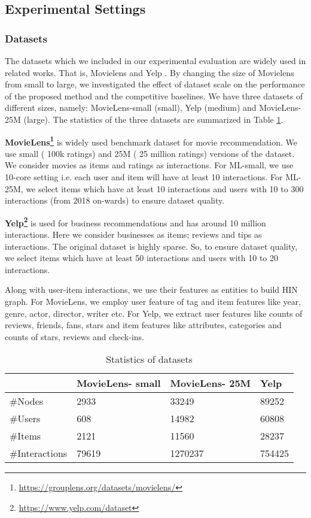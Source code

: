 \documentclass[runningheads, envcountsame, a4paper]{llncs}
\begin{document}
\subsection{Experimental Settings}
\subsubsection{Datasets}
The datasets which we included in our experimental evaluation are widely used in related works. That is, Movielens \cite{berg2017graph,he2015trirank,he2017bneural} and Yelp \cite{wang2019kgat,yu2013recommendation}.
By changing the size of Movielens from small to large, we investigated the effect of dataset scale on the performance of the proposed method and the competitive baselines.
We have three datasets of different sizes, namely: MovieLens-small (small), Yelp (medium) and MovieLens-25M (large). 
The statistics of the three datasets are summarized in Table \ref{tab:datastats}.

\textbf{MovieLens\footnote[1]{\url{https://grouplens.org/datasets/movielens/}}} is widely used benchmark dataset for movie recommendation. We use small ( 100k ratings) and 25M ( 25 million ratings) versions of the dataset. 
We consider movies as items and ratings as interactions. 
For ML-small, we use 10-core setting i.e. each user and item will have at least 10 interactions. 
For ML-25M, we select items which have at least 10 interactions and users with 10 to 300 interactions (from 2018 on-wards) to ensure dataset quality. 

\textbf{Yelp\footnote[2]{\url{https://www.yelp.com/dataset}}} is used for business recommendations and has around 10 million interactions. Here we consider businesses as items; reviews and tips as interactions. The original dataset is highly sparse. So, to ensure dataset quality, we select items which have at least 50 interactions and users with 10 to 20 interactions.

Along with user-item interactions, we use their features as entities to build HIN graph. For MovieLens, we employ user feature of tag and item features like year, genre, actor, director, writer etc. For Yelp, we extract user features like counts of reviews, friends, fans, stars and item features like attributes, categories and counts of stars, reviews and check-ins. 


\begin{table}[t!]
 \vspace{-2mm}
\centering
\begin{tabular}{p{2cm}||p{1.9cm}|p{1.9cm}|p{0.8cm}}
 \hline
  & \textbf{MovieLens- small} & \textbf{MovieLens- 25M} & \textbf{Yelp}\\
  \hline
  \hline
    \#Nodes & 2933 & 33249 & 89252\\
    \#Users & 608 & 14982 & 60808\\
    \#Items & 2121 & 11560 & 28237\\
    \#Interactions & 79619 & 1270237 & 754425\\
 \hline
\end{tabular}
\caption{Statistics of datasets}
\label{tab:datastats}
\vspace{-6mm}
\end{table}
\end{document}
